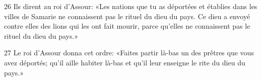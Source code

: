 
26 Ils dirent au roi d’Assour: «Les nations que tu as déportées et établies dans les villes de Samarie ne connaissent pas le rituel du dieu du pays. Ce dieu a envoyé contre elles des lions qui les ont fait mourir, parce qu’elles ne connaissent pas le rituel du dieu du pays.»

27 Le roi d’Assour donna cet ordre: «Faites partir là-bas un des prêtres que vous avez déportés; qu’il aille habiter là-bas et qu’il leur enseigne le rite du dieu du pays.»